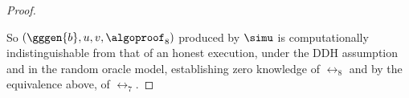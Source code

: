 \begin{proof}
\begin{description}
  \end{description}

  So $(\gggen{b}, u, v, \algoproof_8)$ produced by $\simu$ is computationally
  indistinguishable from that of an honest execution, under the DDH assumption
  and in the random oracle model, establishing zero knowledge of $\rel_8$ and
  by the equivalence above, of $\rel_7$.

\end{proof}
